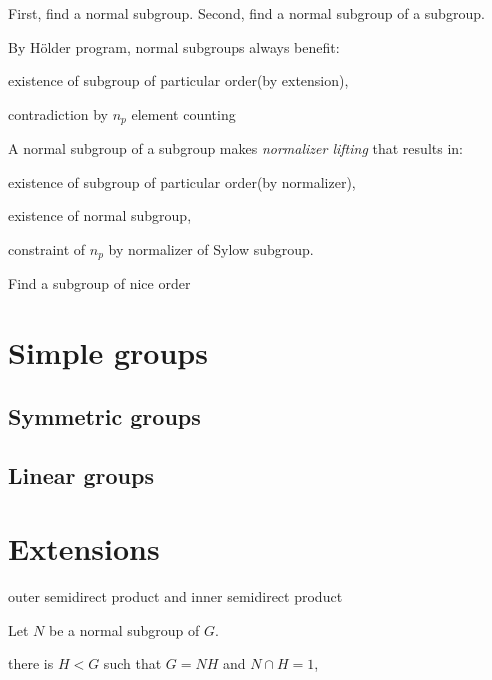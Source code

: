 \documentclass{../exp}
\begin{document}
First, find a normal subgroup.
Second, find a normal subgroup of a subgroup.

By H\"older program, normal subgroups always benefit:
\begin{cond}
\item existence of subgroup of particular order(by extension),
\item contradiction by $n_p$ element counting
\end{cond}
A normal subgroup of a subgroup makes \emph{normalizer lifting} that results in:
\begin{cond}
\item existence of subgroup of particular order(by normalizer),
\item existence of normal subgroup,
\item constraint of $n_p$ by normalizer of Sylow subgroup.
\end{cond}

Find a subgroup of nice order


\section{Simple groups}

\subsection{Symmetric groups}

\subsection{Linear groups}

\section{Extensions}

outer semidirect product and inner semidirect product
\begin{prop}
Let $N$ be a normal subgroup of $G$.
\begin{cond}
\item there is $H<G$ such that $G=NH$ and $N\cap H=1$,
\item 
\item
\end{cond}
\end{prop}
\end{document}
